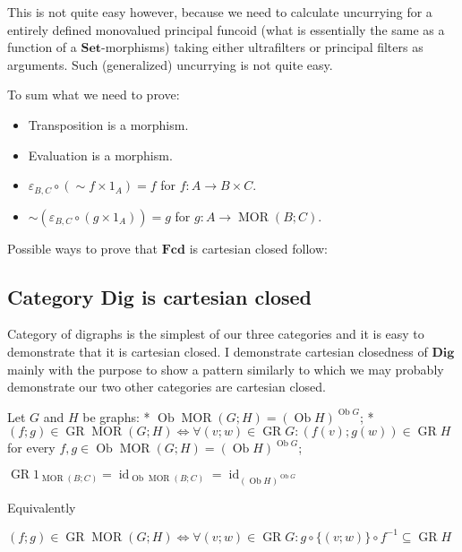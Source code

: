 This is not quite easy however, because we need to calculate uncurrying for a entirely defined monovalued principal funcoid (what is essentially the same as a function of a $\mathbf{Set}$-morphisms) taking either ultrafilters or principal filters as arguments. Such (generalized) uncurrying is not quite easy.

To sum what we need to prove:
\begin{itemize}
\item Transposition is a morphism.
\item Evaluation is a morphism.
\item $\varepsilon_{B,C} \circ ( \sim f \times 1_A) = f$ for $f : A \rightarrow B \times C$.
\item $\sim ( \varepsilon_{B,C} \circ ( g \times 1_A)) = g$ for $g : A \rightarrow \operatorname{MOR} ( B ; C)$.
\end{itemize}

Possible ways to prove that $\mathbf{Fcd}$ is cartesian closed follow:

\subsection{Category Dig is cartesian closed}

Category of digraphs is the simplest of our three categories and it is easy to demonstrate that it is cartesian closed. I demonstrate cartesian closedness of $\mathbf{Dig}$ mainly with the purpose to show a pattern similarly to which we may probably demonstrate our two other categories are cartesian closed.

Let $G$ and $H$ be graphs:
* $\operatorname{Ob} \operatorname{MOR} ( G ; H) = ( \operatorname{Ob} H)^{\operatorname{Ob} G}$;
* $( f ; g) \in \operatorname{GR} \operatorname{MOR} ( G ; H) \Leftrightarrow \forall ( v ; w) \in \operatorname{GR} G : ( f ( v) ; g ( w)) \in \operatorname{GR} H$ for every $f, g \in \operatorname{Ob} \operatorname{MOR} ( G ; H) = ( \operatorname{Ob} H)^{\operatorname{Ob} G}$;

$\operatorname{GR} 1_{\operatorname{MOR} ( B ; C)} = \operatorname{id}_{\operatorname{Ob} \operatorname{MOR} ( B ; C)} = \operatorname{id}_{( \operatorname{Ob} H)^{\operatorname{Ob} G}}$

Equivalently

$( f ; g) \in \operatorname{GR} \operatorname{MOR} ( G ; H) \Leftrightarrow \forall ( v ; w) \in \operatorname{GR} G : g \circ \{ ( v ; w) \} \circ f^{- 1} \subseteq \operatorname{GR} H$

